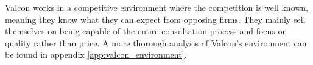 Valcon works in a competitive environment where the competition is well known, meaning they know what they can expect from opposing firms. 
They mainly sell themselves on being capable of the entire consultation process and focus on quality rather than price. 
A more thorough analysis of Valcon's environment can be found in appendix \ref{app:valcon_environment}.